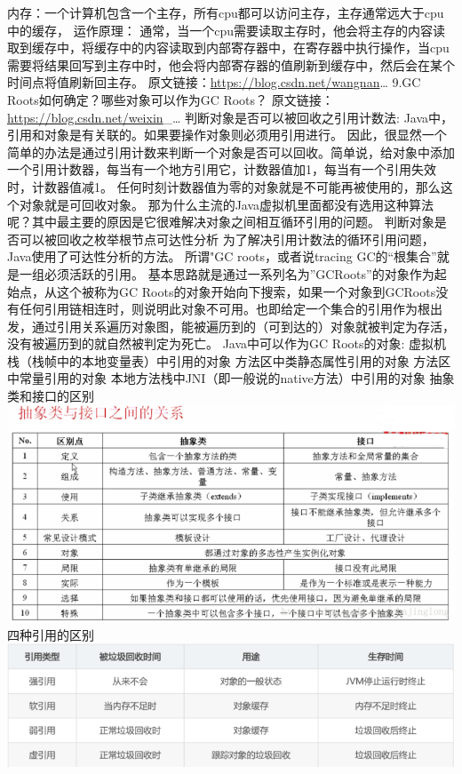 \documentclass[9pt, b5paper]{article}
\begin{document}
内存：一个计算机包含一个主存，所有cpu都可以访问主存，主存通常远大于cpu中的缓存，
运作原理： 通常，当一个cpu需要读取主存时，他会将主存的内容读取到缓存中，将缓存中的内容读取到内部寄存器中，在寄存器中执行操作，当cpu需要将结果回写到主存中时，他会将内部寄存器的值刷新到缓存中，然后会在某个时间点将值刷新回主存。
原文链接：\url{https://blog.csdn.net/wangnan}\ldots{}
9.GC Roots如何确定？哪些对象可以作为GC Roots？
原文链接：\url{https://blog.csdn.net/weixin}\_\ldots{}
判断对象是否可以被回收之引用计数法:
Java中，引用和对象是有关联的。如果要操作对象则必须用引用进行。
因此，很显然一个简单的办法是通过引用计数来判断一个对象是否可以回收。简单说，给对象中添加一个引用计数器，每当有一个地方引用它，计数器值加1，每当有一个引用失效时，计数器值减1。
任何时刻计数器值为零的对象就是不可能再被使用的，那么这个对象就是可回收对象。
那为什么主流的Java虚拟机里面都没有选用这种算法呢？其中最主要的原因是它很难解决对象之间相互循环引用的问题。
判断对象是否可以被回收之枚举根节点可达性分析
为了解决引用计数法的循环引用问题，Java使用了可达性分析的方法。
所谓"GC roots，或者说tracing GC的“根集合”就是一组必须活跃的引用。
基本思路就是通过一系列名为”GCRoots”的对象作为起始点，从这个被称为GC Roots的对象开始向下搜索，如果一个对象到GCRoots没有任何引用链相连时，则说明此对象不可用。也即给定一个集合的引用作为根出发，通过引用关系遍历对象图，能被遍历到的（可到达的）对象就被判定为存活，没有被遍历到的就自然被判定为死亡。
Java中可以作为GC Roots的对象:
虚拟机栈（栈帧中的本地变量表）中引用的对象
方法区中类静态属性引用的对象
方法区中常量引用的对象
本地方法栈中JNI（即一般说的native方法）中引用的对象
抽象类和接口的区别
\includegraphics[width=.9\linewidth]{./pic/interface.png}
四种引用的区别
\includegraphics[width=.9\linewidth]{./pic/reference.png}
\end{document}
